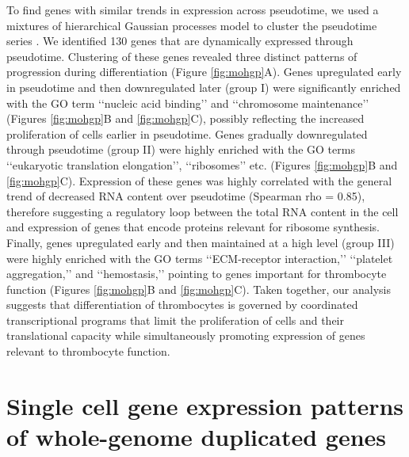 To find genes with similar trends in expression across pseudotime, we used a mixtures of hierarchical Gaussian processes model to cluster the pseudotime series \cite{Hensman2015-op}. We identified 130 genes that are dynamically expressed through pseudotime. Clustering of these genes revealed three distinct patterns of progression during differentiation (Figure \ref{fig:mohgp}A). Genes upregulated early in pseudotime and then downregulated later (group I) were significantly enriched with the GO term ‘‘nucleic acid binding’’ and ‘‘chromosome maintenance’’ (Figures \ref{fig:mohgp}B and \ref{fig:mohgp}C), possibly reflecting the increased proliferation of cells earlier in pseudotime. Genes gradually downregulated through pseudotime (group II) were highly enriched with the GO terms ‘‘eukaryotic translation elongation’’, ‘‘ribosomes’’ etc. (Figures \ref{fig:mohgp}B and \ref{fig:mohgp}C). Expression of these genes was highly correlated with the general trend of decreased RNA content over pseudotime (Spearman rho = 0.85), therefore suggesting a regulatory loop between the total RNA content in the cell and expression of genes that encode proteins relevant for ribosome synthesis. Finally, genes upregulated early and then maintained at a high level (group III) were highly enriched with the GO terms ‘‘ECM-receptor interaction,’’ ‘‘platelet aggregation,’’ and ‘‘hemostasis,’’ pointing to genes important for thrombocyte function (Figures \ref{fig:mohgp}B and \ref{fig:mohgp}C). Taken together, our analysis suggests that differentiation of thrombocytes is governed by coordinated transcriptional programs that limit the proliferation of cells and their translational capacity while simultaneously promoting expression of genes relevant to thrombocyte function.

\section{Single cell gene expression patterns of whole-genome duplicated genes}

